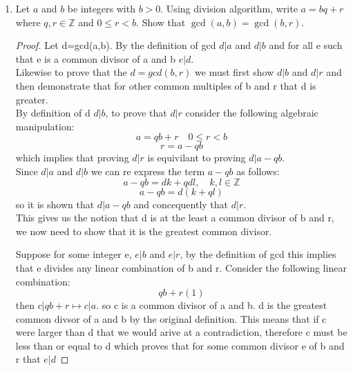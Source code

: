 \documentclass[11pt]{article}
\theoremstyle{definition}  %
\newcommand{\Z}{\mathbb{Z}}
\begin{document}
\begin{enumerate}
\begin{proof}
\begin{align*}
  &g|g\\
  &g|at+bu\\
  g|1
\end{align*}

then by the definition of gcd $g|a$ and $g|b$.
\end{proof}
\item Let $a$ and $b$ be integers with $b >0$. Using division algorithm, write $a = bq + r$ where $q, r \in \Z$ and $0 \leq r < b$. Show that $\gcd(a,b) = \gcd(b, r)$.
\begin{proof}
Let d=gcd(a,b). By the definition of gcd $d|a$ and $d|b$ and for all e such that e is a common divisor of a and b $e|d$. \\
Likewise to prove that the $d=gcd(b,r)$ we must first show $d|b$ and $d|r$ and then demonstrate that for other common multiples of b and r that d is greater. \\
By definition of d $d|b$, to prove that $d|r$ consider the following algebraic manipulation:
\[
  a=qb+r \quad 0\leq r <b
\]
\[
  r=a-qb
\]
which implies that proving $d|r$ is equivilant to proving $d|a-qb$.\\
Since $d|a$ and $d|b$ we can re express the term $a-qb$ as follows:
\[
  a-qb=dk+qdl,\quad k,l\in \Z
\]
\[
  a-qb=d(k+ql)
\]
so it is shown that $d|a-qb$ and concequently that $d|r$. \\
This gives us the notion that d is at the least a common divisor of b and r, we now need to show that it is the greatest common divisor.

Suppose for some integer e, $e|b$ and $e|r$,
by the definition of gcd this implies that e divides any linear combination of b and r. Consider the following linear combination:
\[
  qb+r(1)
\]
then $c|qb+r\mapsto c|a$. so c is a common divisor of a and b. d is the greatest common divsor of a and b by the original definition. This means that if c were larger than d that we would arive at a contradiction, therefore c must be less than or equal to d which proves that for some common divisor e of b and r that $e|d$


\end{proof}
\end{enumerate}
\end{document}
